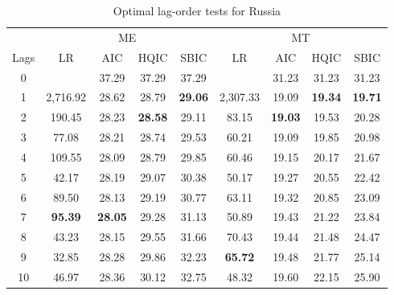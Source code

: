 \documentclass[a4paper, twoside]{templates/ociamthesis}
\begin{document}
\begin{table}[H]

\caption{\label{tab:TableC28}Optimal lag-order tests for Russia}
\centering
\fontsize{10}{12}\selectfont
\begin{tabular}[t]{ccccccccc}
\toprule
\multicolumn{1}{c}{ } & \multicolumn{4}{c}{ME} & \multicolumn{4}{c}{MT} \\
\cmidrule(l{3pt}r{3pt}){2-5} \cmidrule(l{3pt}r{3pt}){6-9}
Lags & LR & AIC & HQIC & SBIC & LR & AIC & HQIC & SBIC\\
\midrule
0 &  & 37.29 & 37.29 & 37.29 &  & 31.23 & 31.23 & 31.23\\
1 & 2,716.92 & 28.62 & 28.79 & \textbf{29.06} & 2,307.33 & 19.09 & \textbf{19.34} & \textbf{19.71}\\
2 & 190.45 & 28.23 & \textbf{28.58} & 29.11 & 83.15 & \textbf{19.03} & 19.53 & 20.28\\
3 & 77.08 & 28.21 & 28.74 & 29.53 & 60.21 & 19.09 & 19.85 & 20.98\\
4 & 109.55 & 28.09 & 28.79 & 29.85 & 60.46 & 19.15 & 20.17 & 21.67\\
5 & 42.17 & 28.19 & 29.07 & 30.38 & 50.17 & 19.27 & 20.55 & 22.42\\
6 & 89.50 & 28.13 & 29.19 & 30.77 & 63.11 & 19.32 & 20.85 & 23.09\\
7 & \textbf{95.39} & \textbf{28.05} & 29.28 & 31.13 & 50.89 & 19.43 & 21.22 & 23.84\\
8 & 43.23 & 28.15 & 29.55 & 31.66 & 70.43 & 19.44 & 21.48 & 24.47\\
9 & 32.85 & 28.28 & 29.86 & 32.23 & \textbf{65.72} & 19.48 & 21.77 & 25.14\\
10 & 46.97 & 28.36 & 30.12 & 32.75 & 48.32 & 19.60 & 22.15 & 25.90\\
\bottomrule
\end{tabular}
\end{table}

\clearpage
\end{document}
